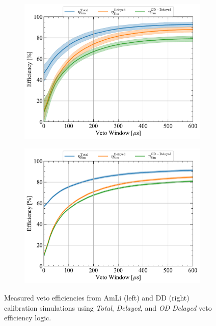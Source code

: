 \begin{figure}[ht!]
    \centering
    \begin{subfigure}[b]{0.49\textwidth}
        \centering
        \includegraphics[width=\textwidth]{figures/VetoEfficiency/AmLiEfficiencies_Sim.pdf}
        \caption{}
        \label{fig:VetoEff/AmLiSimEfficiencies}
    \end{subfigure}
    \hfill
    \begin{subfigure}[b]{0.49\textwidth}
        \centering
        \includegraphics[width=\textwidth]{figures/VetoEfficiency/DDEfficiencies_Sim.pdf}
        \caption{}
        \label{fig:VetoEff/DDSimEfficiencies}
    \end{subfigure}
    \caption{Measured veto efficiencies from AmLi (left) and DD (right) calibration simulations using \textit{Total}, \textit{Delayed}, and \textit{OD Delayed} veto efficiency logic.}
    \label{fig:VetoEff/CalibrationSimEfficiencies}
\end{figure}
